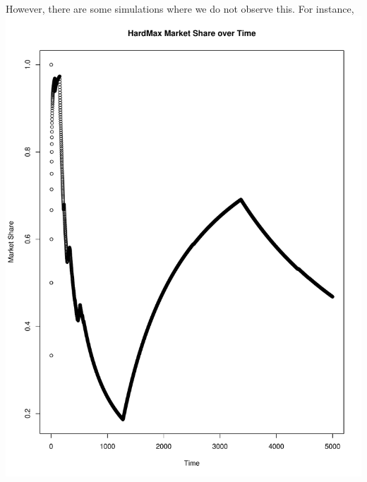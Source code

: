 \documentclass[11pt,letterpaper]{article}
\begin{document}
However, there are some simulations where we do not observe this. For instance, \\
\includegraphics[scale=0.30]{odd_ms_over_time} \\
\end{document}
